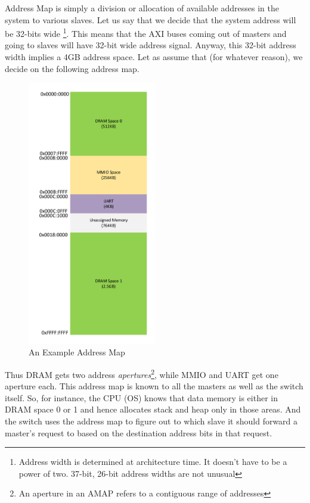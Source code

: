 Address Map is simply a division or allocation of available addresses in the system to various slaves. Let us say that we decide that the system address will be 32-bits wide \footnote{Address width is determined at architecture time. It doesn't have to be a power of two. 37-bit, 26-bit address widths are not unusual}. This means that the AXI buses coming out of masters and going to slaves will have 32-bit wide address signal. Anyway, this 32-bit address width implies a 4GB address space. Let as assume that (for whatever reason), we decide on the following address map.

	\begin{figure}[h]
	\centering
	\includegraphics[width = 0.5\textwidth]{partSys/Amap}
	\caption{An Example Address Map}
	\label{fig:sampleAmap}
	\end{figure}
	
Thus DRAM gets two address \emph{apertures}\footnote{An aperture in an AMAP refers to a contiguous range of addresses}, while MMIO and UART get one aperture each. This address map is known to all the masters as well as the switch itself. So, for instance, the CPU (OS) knows that data memory is either in DRAM space 0 or 1 and hence allocates stack and heap only in those areas. And the switch uses the address map to figure out to which slave it should forward a master's request to based on the destination address bits in that request. 

